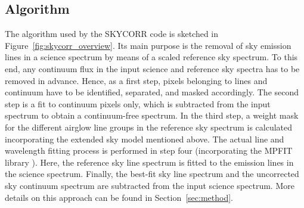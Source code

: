 \subsection{Algorithm}\label{sec:algorithm}
The algorithm used by the SKYCORR code is sketched in
Figure~\ref{fig:skycorr_overview}. Its main purpose is the removal of sky
emission lines in a science spectrum by means of a scaled reference sky
spectrum. To this end, any continuum flux in the input science and reference
sky spectra has to be removed in advance. Hence, as a first step, pixels
belonging to lines and continuum have to be identified, separated, and masked
accordingly. The second step is a fit to continuum pixels only, which is
subtracted from the input spectrum to obtain a continuum-free spectrum. In the
third step, a weight mask for the different airglow line groups in the
reference sky spectrum is calculated incorporating the extended sky model
mentioned above. The actual line and wavelength fitting process is performed in
step four (incorporating the MPFIT library \cite{CMPFIT}). Here, the reference
sky line spectrum is fitted to the emission lines in the science spectrum.
Finally, the best-fit sky line spectrum and the uncorrected sky continuum
spectrum are subtracted from the input science spectrum. More details on this
approach can be found in Section~\ref{sec:method}.

